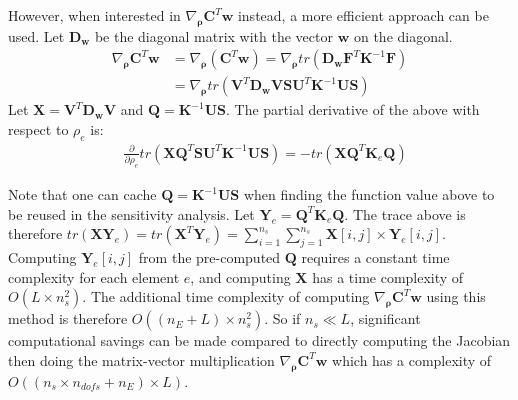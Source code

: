     However, when interested in $\nabla_{\bm{\rho}} \bm{C}^T \bm{w}$ instead, a more efficient approach can be used. Let $\bm{D}_{\bm{w}}$ be the diagonal matrix with the vector $\bm{w}$ on the diagonal.
    \begin{align}
     \nabla_{\bm{\rho}} \bm{C}^T \bm{w} & = \nabla_{\bm{\rho}} (\bm{C}^T \bm{w}) = \nabla_{\bm{\rho}} tr(\bm{D}_{\bm{w}} \bm{F}^T \bm{K}^{-1} \bm{F}) \\
     & = \nabla_{\bm{\rho}} tr(\bm{V}^T \bm{D}_{\bm{w}} \bm{V} \bm{S} \bm{U}^T \bm{K}^{-1} \bm{U} \bm{S})
    \end{align}
    Let $\bm{X} = \bm{V}^T \bm{D}_{\bm{w}} \bm{V}$ and $\bm{Q} = \bm{K}^{-1} \bm{U} \bm{S}$. The partial derivative of the above with respect to $\rho_e$ is:
    \begin{align}
     & \frac{\partial}{\partial \rho_e} tr(\bm{X} \bm{Q}^T \bm{S} \bm{U}^T \bm{K}^{-1} \bm{U} \bm{S}) = -tr(\bm{X} \bm{Q}^T \bm{K}_e \bm{Q})
    \end{align}

    Note that one can cache $\bm{Q} = \bm{K}^{-1} \bm{U} \bm{S}$ when finding the function value above to be reused in the sensitivity analysis. Let $\bm{Y}_e = \bm{Q}^T \bm{K}_e \bm{Q}$. The trace above is therefore $tr(\bm{X} \bm{Y}_e) = tr(\bm{X}^T \bm{Y}_e) = \sum_{i=1}^{n_s} \sum_{j=1}^{n_s} \bm{X}[i,j] \times \bm{Y}_e[i,j]$. Computing $\bm{Y}_e[i,j]$ from the pre-computed $\bm{Q}$ requires a constant time complexity for each element $e$, and computing $\bm{X}$ has a time complexity of $O(L \times n_s^2)$. The additional time complexity of computing $\nabla_{\bm{\rho}} \bm{C}^T \bm{w}$ using this method is therefore $O((n_E + L) \times n_s^2)$. So if $n_s \ll L$, significant computational savings can be made compared to directly computing the Jacobian then doing the matrix-vector multiplication $\nabla_{\bm{\rho}} \bm{C}^T \bm{w}$ which has a complexity of $O((n_s \times n_{dofs} + n_E) \times L)$.


